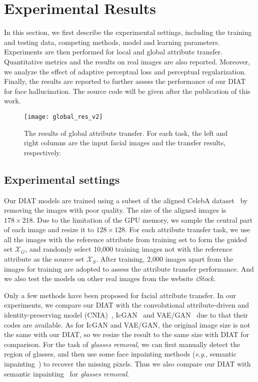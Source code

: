 \documentclass[journal]{IEEEtran}
\newcommand{\eg}{\textit{e}.\textit{g}.}
\begin{document}
\section{Experimental Results}
\label{sec:exp}

In this section, we first describe the experimental settings, including the training and testing data, competing methods, model and learning parameters.
Experiments are then performed for local and global attribute transfer.
Quantitative metrics and the results on real images are also reported.
Moreover, we analyze the effect of adaptive perceptual loss and perceptual regularization.
Finally, the results are reported to further assess the performance of our DIAT for face hallucination.
The source code will be given after the publication of this work.

\begin{figure*}
\begin{center}
\texttt{[image: global\_res\_v2]}
\end{center}
   \caption{The results of global attribute transfer. For each task, the left and right columns are the input facial images and the transfer results, respectively.}
\label{global_results}
\end{figure*}


\subsection{Experimental settings}
Our DIAT models are trained using a subset of the aligned CelebA dataset~\cite{liu2015faceattributes} by removing the images with poor quality.
The size of the aligned images is $178\times218$. Due to the limitation of the GPU memory, we sample the central part of each image and resize it to $128\times128$.
For each attribute transfer task, we use all the images with the reference attribute from training set to form the guided set $\mathcal{X}_G$, and randomly select 10,000 training images not with the reference attribute as the source set $\mathcal{X}_S$.
After training, 2,000 images apart from the images for training are adopted to assess the attribute transfer performance.
And we also test the models on other real images from the website \emph{iStock}.



Only a few methods have been proposed for facial attribute transfer.
In our experiments, we compare our DIAT with the convolutional attribute-driven and identity-preserving model (CNIA)~\cite{li2016convolutional}, IcGAN~\cite{Perarnau2016} and VAE/GAN~\cite{larsen2015autoencoding} due to that their codes are available.
As for IcGAN and VAE/GAN, the original image size is not the same with our DIAT, so we resize the result to the same size with DIAT for comparison.
For the task of \emph{glasses removal}, we can first manually detect the region of glasses, and then use some face inpainting methods (\eg, semantic inpainting~\cite{yeh2016semantic}) to recover the missing pixels.
Thus we also compare our DIAT with semantic inpainting~\cite{yeh2016semantic} for \emph{glasses removal}.
\end{document}
